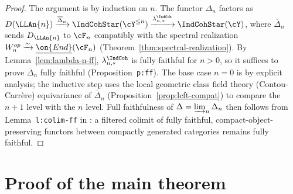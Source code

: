 \begin{proof}
  The argument is by induction on $n$. The functor $\Delta_n$ factors as
  $D(\LLAn{n}) \xrightarrow{\overline{\Delta}_n} \IndCohStar(\cY^{\leq n})
  \xrightarrow{\lambda_{n,*}^{\IndCoh}} \IndCohStar(\cY)$, where
  $\overline{\Delta}_n$ sends $D_{\LLAn{n}}$ to $\cF_n$ compatibly with the
  spectral realization $W_n^{op} \xrightarrow{\sim}
  \underline{\on{End}}(\cF_n)$ (Theorem~\ref{thm:spectral-realization}).
  By Lemma~\ref{lem:lambda-n-ff}, $\lambda_{n,*}^{\IndCoh}$ is fully faithful
  for $n > 0$, so it suffices to prove $\overline{\Delta}_n$ fully faithful
  (Proposition~\texttt{p:ff}). The base case $n = 0$ is by explicit analysis;
  the inductive step uses the local geometric class field theory
  (Contou-Carr\`ere) equivariance of $\overline{\Delta}_n$
  (Proposition~\ref{prop:lcft-compat}) to compare the $n+1$ level with the
  $n$ level. Full faithfulness of $\Delta = \varinjlim_n \Delta_n$ then
  follows from Lemma~\texttt{l:colim-ff} in \cite{hilburn-raskin}: a filtered
  colimit of fully faithful, compact-object-preserving functors between
  compactly generated categories remains fully faithful.
\end{proof}

\section{Proof of the main theorem}
\label{sec:main-results}

